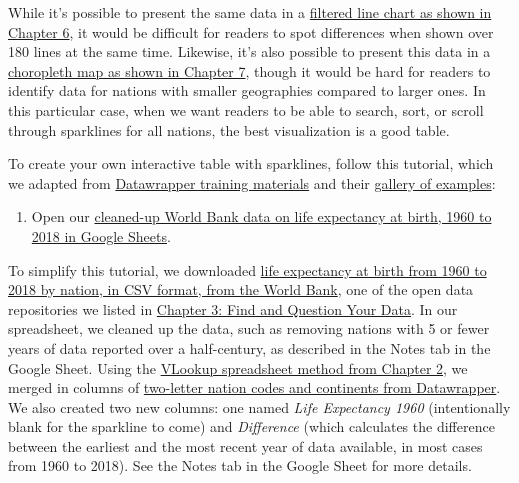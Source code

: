 \documentclass[
  english,
]{book}
\providecommand{\tightlist}{%
  \setlength{\itemsep}{0pt}\setlength{\parskip}{0pt}}
\begin{document}
While it's possible to present the same data in a \href{filtered-line-tableau.html}{filtered line chart as shown in Chapter 6}, it would be difficult for readers to spot differences when shown over 180 lines at the same time. Likewise, it's also possible to present this data in a \href{choropleth-datawrapper.html}{choropleth map as shown in Chapter 7}, though it would be hard for readers to identify data for nations with smaller geographies compared to larger ones. In this particular case, when we want readers to be able to search, sort, or scroll through sparklines for all nations, the best visualization is a good table.

To create your own interactive table with sparklines, follow this tutorial, which we adapted from \href{https://www.datawrapper.de/training-materials/}{Datawrapper training materials} and their \href{https://www.datawrapper.de/tables/}{gallery of examples}:

\begin{enumerate}
\def\labelenumi{\arabic{enumi}.}
\tightlist
\item
  Open our \href{https://docs.google.com/spreadsheets/d/1Wev14VaXyq7d7yuYo-7FwRoAjyyaY1v6z_qBoo_4VSo/edit\#gid=3466257}{cleaned-up World Bank data on life expectancy at birth, 1960 to 2018 in Google Sheets}.
\end{enumerate}

To simplify this tutorial, we downloaded \href{https://data.worldbank.org/indicator/SP.DYN.LE00.IN}{life expectancy at birth from 1960 to 2018 by nation, in CSV format, from the World Bank}, one of the open data repositories we listed in \href{find.html}{Chapter 3: Find and Question Your Data}. In our spreadsheet, we cleaned up the data, such as removing nations with 5 or fewer years of data reported over a half-century, as described in the Notes tab in the Google Sheet. Using the \href{vlookup.html}{VLookup spreadsheet method from Chapter 2}, we merged in columns of \href{https://github.com/datawrapper/datawrapper/wiki/Country-flag-icons}{two-letter nation codes and continents from Datawrapper}. We also created two new columns: one named \emph{Life Expectancy 1960} (intentionally blank for the sparkline to come) and \emph{Difference} (which calculates the difference between the earliest and the most recent year of data available, in most cases from 1960 to 2018). See the Notes tab in the Google Sheet for more details.
\end{document}
